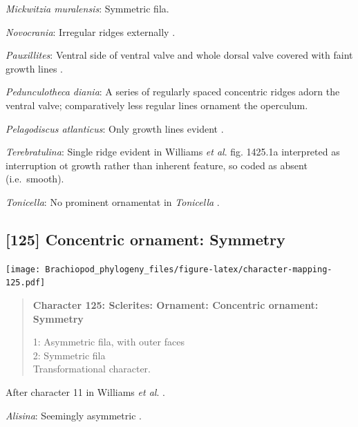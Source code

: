 \documentclass[openany]{book}
\begin{document}
\hypertarget{Mickwitzia_muralensis-coding-124}{}
\emph{Mickwitzia muralensis}: Symmetric fila.

\hypertarget{Novocrania-coding-124}{}
\emph{Novocrania}: Irregular ridges externally
\citep{Williams2000LinguliformeaCraniiformea}.

\hypertarget{Pauxillites-coding-124}{}
\emph{Pauxillites}: Ventral side of ventral valve and whole dorsal valve
covered with faint growth lines \citep{Valent2015}.

\hypertarget{Pedunculotheca_diania-coding-124}{}
\emph{Pedunculotheca diania}: A series of regularly spaced concentric
ridges adorn the ventral valve; comparatively less regular lines
ornament the operculum.

\hypertarget{Pelagodiscus_atlanticus-coding-124}{}
\emph{Pelagodiscus atlanticus}: Only growth lines evident
\citep{Williams2000LinguliformeaCraniiformea}.

\hypertarget{Terebratulina-coding-124}{}
\emph{Terebratulina}: Single ridge evident in Williams \emph{et al}.
\citeyearpar{Williams2006Rhynchonelliformeapart} fig. 1425.1a
interpreted as interruption ot growth rather than inherent feature, so
coded as absent (i.e.~smooth).

\hypertarget{Tonicella-coding-124}{}
\emph{Tonicella}: No prominent ornamentat in \emph{Tonicella}
\citep{Connors2012}.

\subsection*{{[}125{]} Concentric ornament:
Symmetry}\label{concentric-ornament-symmetry}

\texttt{[image: Brachiopod\_phylogeny\_files/figure-latex/character-mapping-125.pdf]}

\begin{quote}
\textbf{Character 125: Sclerites: Ornament: Concentric ornament:
Symmetry}

1: Asymmetric fila, with outer faces\\
2: Symmetric fila\\
Transformational character.
\end{quote}

After character 11 in Williams \emph{et al}.
\citeyearpar{Williams1998Thediversity}.

\hypertarget{Alisina-coding-125}{}
\emph{Alisina}: Seemingly asymmetric \citetext{\citealp[fig.
122.3c]{Williams2000LinguliformeaCraniiformea}; \citealp[Fig.
1]{Zhang2011Anobolellate}}.
\end{document}
